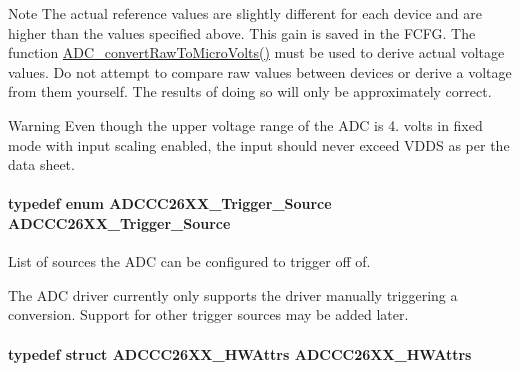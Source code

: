 \begin{DoxyNote}{Note}
The actual reference values are slightly different for each device and are higher than the values specified above. This gain is saved in the F\+C\+F\+G. The function \hyperlink{_a_d_c_8h_a81e762c06c3957c01d3271bdecef358d}{A\+D\+C\+\_\+convert\+Raw\+To\+Micro\+Volts()} must be used to derive actual voltage values. Do not attempt to compare raw values between devices or derive a voltage from them yourself. The results of doing so will only be approximately correct.
\end{DoxyNote}
\begin{DoxyWarning}{Warning}
Even though the upper voltage range of the A\+D\+C is 4. volts in fixed mode with input scaling enabled, the input should never exceed V\+D\+D\+S as per the data sheet. 
\end{DoxyWarning}
\paragraph[{A\+D\+C\+C\+C26\+X\+X\+\_\+\+Trigger\+\_\+\+Source}]{\setlength{\rightskip}{0pt plus 5cm}typedef enum {\bf A\+D\+C\+C\+C26\+X\+X\+\_\+\+Trigger\+\_\+\+Source}  {\bf A\+D\+C\+C\+C26\+X\+X\+\_\+\+Trigger\+\_\+\+Source}}\label{_a_d_c_c_c26_x_x_8h_a09a1c4f09a9c71437616da95458b10ea}


List of sources the A\+D\+C can be configured to trigger off of. 

The A\+D\+C driver currently only supports the driver manually triggering a conversion. Support for other trigger sources may be added later. 
\paragraph[{A\+D\+C\+C\+C26\+X\+X\+\_\+\+H\+W\+Attrs}]{\setlength{\rightskip}{0pt plus 5cm}typedef struct {\bf A\+D\+C\+C\+C26\+X\+X\+\_\+\+H\+W\+Attrs}  {\bf A\+D\+C\+C\+C26\+X\+X\+\_\+\+H\+W\+Attrs}}\label{_a_d_c_c_c26_x_x_8h_a02974734e3c626de2dfe586e4498addf}


